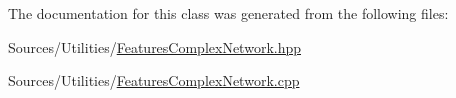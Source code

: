 The documentation for this class was generated from the following files\+:\begin{DoxyCompactItemize}
\item 
Sources/\+Utilities/\hyperlink{_features_complex_network_8hpp}{Features\+Complex\+Network.\+hpp}\item 
Sources/\+Utilities/\hyperlink{_features_complex_network_8cpp}{Features\+Complex\+Network.\+cpp}\end{DoxyCompactItemize}
